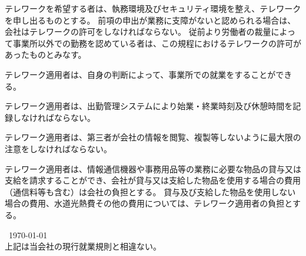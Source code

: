 \documentclass[10pt,a4paper]{jsarticle}
\begin{document}
テレワークを希望する者は、執務環境及びセキュリティ環境を整え、テレワークを申し出るものとする。
\term 前項の申出が業務に支障がないと認められる場合は、会社はテレワークの許可をしなければならない。
\term 従前より労働者の裁量によって事業所以外での勤務を認めている者は、この規程におけるテレワークの許可があったものとみなす。

テレワーク適用者は、自身の判断によって、事業所での就業をすることができる。

テレワーク適用者は、出勤管理システムにより始業・終業時刻及び休憩時間を記録しなければならない。

テレワーク適用者は、第三者が会社の情報を閲覧、複製等しないように最大限の注意をしなければならない。

テレワーク適用者は、情報通信機器や事務用品等の業務に必要な物品の貸与又は支給を請求することができ、会社が貸与又は支給した物品を使用する場合の費用（通信料等も含む）は会社の負担とする。
\term 貸与及び支給した物品を使用しない場合の費用、水道光熱費その他の費用については、テレワーク適用者の負担とする。




\begin{flushleft}\
\today\\
\vspace{10pt}
上記は当会社の現行就業規則と相違ない。\\
\vspace{10pt}

\MakeSignatureField
\end{flushleft}
\end{document}
